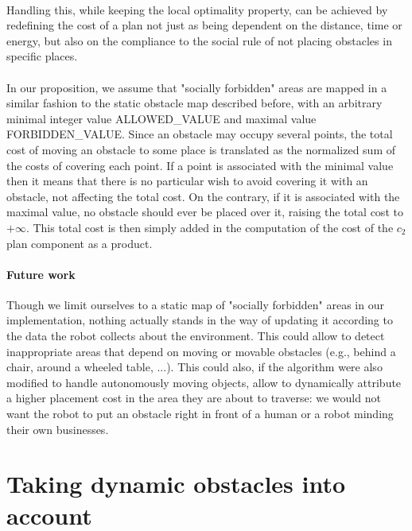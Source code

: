 \paragraph{} Handling this, while keeping the local optimality property, can be achieved by redefining the cost of a plan not just as being dependent on the distance, time or energy, but also on the compliance to the social rule of not placing obstacles in specific places.

\paragraph{} In our proposition, we assume that "socially forbidden" areas are mapped in a similar fashion to the static obstacle map described before, with an arbitrary minimal integer value ALLOWED\_VALUE and maximal value FORBIDDEN\_VALUE. Since an obstacle may occupy several points, the total cost of moving an obstacle to some place is translated as the normalized sum of the costs of covering each point. If a point is associated with the minimal value then it means that there is no particular wish to avoid covering it with an obstacle, not affecting the total cost. On the contrary, if it is associated with the maximal value, no obstacle should ever be placed over it, raising the total cost to $+\infty$. This total cost is then simply added in the computation of the cost of the $c_{2}$ plan component as a product.


\paragraph{Future work} Though we limit ourselves to a static map of "socially forbidden" areas in our implementation, nothing actually stands in the way of updating it according to the data the robot collects about the environment. This could allow to detect inappropriate areas that depend on moving or movable obstacles (e.g., behind a chair, around a wheeled table, ...). This could also, if the algorithm were also modified to handle autonomously moving objects, allow to dynamically attribute a higher placement cost in the area they are about to traverse: we would not want the robot to put an obstacle right in front of a human or a robot minding their own businesses.

\section{Taking dynamic obstacles into account}\label{dynamic_section}

